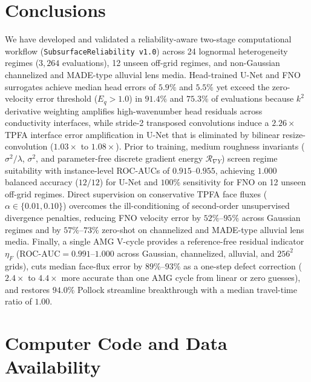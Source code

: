 \documentclass[preprint,12pt,authoryear]{elsarticle}
\begin{document}
\section{Conclusions}
\label{sec:conclusions}

We have developed and validated a reliability-aware two-stage computational workflow (\texttt{SubsurfaceReliability v1.0}) across 24 lognormal heterogeneity regimes ($3{,}264$ evaluations), 12 unseen off-grid regimes, and non-Gaussian channelized and MADE-type alluvial lens media. Head-trained U-Net and FNO surrogates achieve median head errors of $5.9\%$ and $5.5\%$ yet exceed the zero-velocity error threshold ($E_q > 1.0$) in $91.4\%$ and $75.3\%$ of evaluations because $k^2$ derivative weighting amplifies high-wavenumber head residuals across conductivity interfaces, while stride-2 transposed convolutions induce a $2.26\times$ TPFA interface error amplification in U-Net that is eliminated by bilinear resize-convolution ($1.03\times$ to $1.08\times$). Prior to training, medium roughness invariants ($\sigma^2/\lambda$, $\sigma^2$, and parameter-free discrete gradient energy $\mathcal{R}_{\nabla Y}$) screen regime suitability with instance-level ROC-AUCs of $0.915$--$0.955$, achieving $1.000$ balanced accuracy ($12/12$) for U-Net and $100\%$ sensitivity for FNO on 12 unseen off-grid regimes. Direct supervision on conservative TPFA face fluxes ($\alpha \in \{0.01, 0.10\}$) overcomes the ill-conditioning of second-order unsupervised divergence penalties, reducing FNO velocity error by $52\%$--$95\%$ across Gaussian regimes and by $57\%$--$73\%$ zero-shot on channelized and MADE-type alluvial lens media. Finally, a single AMG V-cycle provides a reference-free residual indicator $\eta_F$ ($\text{ROC-AUC} = 0.991$--$1.000$ across Gaussian, channelized, alluvial, and $256^2$ grids), cuts median face-flux error by $89\%$--$93\%$ as a one-step defect correction ($2.4\times$ to $4.4\times$ more accurate than one AMG cycle from linear or zero guesses), and restores $94.0\%$ Pollock streamline breakthrough with a median travel-time ratio of $1.00$.

\section{Computer Code and Data Availability}
\label{sec:data}
\end{document}
